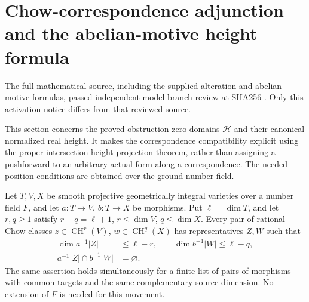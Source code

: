 \section{Chow-correspondence adjunction and the abelian-motive height formula}
\label{r16ha:section}

The full mathematical source, including the supplied-alteration
and abelian-motive formulas, passed independent model-branch
review at SHA256
.
Only this activation notice differs from that reviewed source.

This section concerns the proved obstruction-zero domains
$\mathcal H$ and their canonical normalized real height. It makes
the correspondence compatibility explicit using the proper-intersection
height projection theorem, rather than assigning a pushforward to an
arbitrary actual form along a correspondence. The needed position
conditions are obtained over the ground number field.

\begin{lemma}
\label{r16ha:moving}
Let $T,V,X$ be smooth projective geometrically integral varieties
over a number field $F$, and let $a:T\to V$, $b:T\to X$ be
morphisms. Put $\ell=\dim T$, and let $r,q\geq1$ satisfy
$r+q=\ell+1$, $r\leq\dim V$, $q\leq\dim X$.
Every pair of rational Chow classes $z\in\operatorname{CH}^r(V)$,
$w\in\operatorname{CH}^q(X)$ has representatives $Z,W$ such that
\[
 \begin{split}
 \dim a^{-1}|Z|&\leq\ell-r,\qquad
 \dim b^{-1}|W|\leq\ell-q,\\
 a^{-1}|Z|\cap b^{-1}|W|&=\varnothing.
 \end{split}
 \tag{HA16.1}\label{r16ha:position}
\]
The same assertion holds simultaneously for a finite list of pairs
of morphisms with common targets and the same complementary
source dimension. No extension of $F$ is needed for this movement.
\end{lemma}

